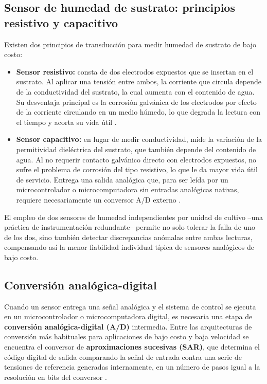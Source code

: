 \subsection{Sensor de humedad de sustrato: principios resistivo y capacitivo}
\label{subsec:humedad_sustrato}

Existen dos principios de transducción para medir humedad de sustrato de bajo costo:

\begin{itemize}
    \item \textbf{Sensor resistivo:} consta de dos electrodos expuestos que se insertan en el sustrato. Al aplicar una tensión entre ambos, la corriente que circula depende de la conductividad del sustrato, la cual aumenta con el contenido de agua. Su desventaja principal es la corrosión galvánica de los electrodos por efecto de la corriente circulando en un medio húmedo, lo que degrada la lectura con el tiempo y acorta su vida útil \cite{suelo_capacitivo_resistivo}.
    \item \textbf{Sensor capacitivo:} en lugar de medir conductividad, mide la variación de la permitividad dieléctrica del sustrato, que también depende del contenido de agua. Al no requerir contacto galvánico directo con electrodos expuestos, no sufre el problema de corrosión del tipo resistivo, lo que le da mayor vida útil de servicio. Entrega una salida analógica que, para ser leída por un microcontrolador o microcomputadora sin entradas analógicas nativas, requiere necesariamente un conversor A/D externo \cite{suelo_capacitivo_resistivo}.
\end{itemize}

El empleo de dos sensores de humedad independientes por unidad de cultivo --una práctica de instrumentación redundante-- permite no solo tolerar la falla de uno de los dos, sino también detectar discrepancias anómalas entre ambas lecturas, compensando así la menor fiabilidad individual típica de sensores analógicos de bajo costo.

\subsection{Conversión analógica-digital}
\label{subsec:conversion_ad}

Cuando un sensor entrega una señal analógica y el sistema de control se ejecuta en un microcontrolador o microcomputadora digital, es necesaria una etapa de \textbf{conversión analógica-digital (A/D)} intermedia. Entre las arquitecturas de conversión más habituales para aplicaciones de bajo costo y baja velocidad se encuentra el conversor de \textbf{aproximaciones sucesivas (SAR)}, que determina el código digital de salida comparando la señal de entrada contra una serie de tensiones de referencia generadas internamente, en un número de pasos igual a la resolución en bits del conversor \cite{ogata2010}.

